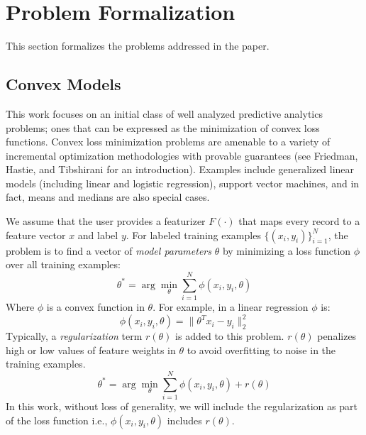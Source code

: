 \section{Problem Formalization}\label{statements}
\noindent This section formalizes the problems addressed in the paper.

\subsection{Convex Models}
This work focuses on an initial class of well analyzed predictive analytics problems; ones that can be expressed as the minimization of convex loss functions.
Convex loss minimization problems are amenable to a variety of incremental optimization methodologies with provable guarantees (see Friedman, Hastie, and Tibshirani \cite{friedman2001elements} for an introduction).
Examples include generalized linear models (including linear and logistic regression), support vector machines, and in fact, means and medians are also special cases. 

We assume that the user provides a featurizer $F(\cdot)$ that maps every record to a feature vector $x$ and label $y$.
For labeled training examples $\{(x_{i},y_{i})\}_{i=1}^{N}$, the problem is to find a vector of \emph{model parameters} $\theta$ by minimizing a loss function $\phi$ over all training examples:
\[
 \theta^{*}=\arg\min_{\theta}\sum_{i=1}^{N}\phi(x_{i},y_{i},\theta)
\]
Where $\phi$ is a convex function in $\theta$.
For example, in a linear regression $\phi$ is:
\[
\phi(x_{i},y_{i},\theta) = \|\theta^Tx_{i} - y_i \|_2^2
\]
Typically, a \emph{regularization} term $r(\theta)$ is added to this problem.
$r(\theta)$ penalizes high or low values of feature weights in $\theta$ to avoid overfitting to noise in the training examples.
\[
 \theta^{*}=\arg\min_{\theta}\sum_{i=1}^{N}\phi(x_{i},y_{i},\theta) + r(\theta)
\]
In this work, without loss of generality, we will include the regularization as part of the loss function i.e., $\phi(x_{i},y_{i},\theta)$ includes $r(\theta)$.

